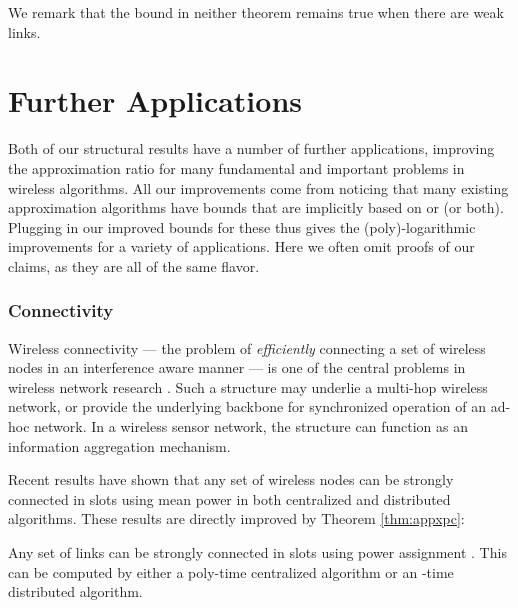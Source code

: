 \documentclass[11pt]{amsart}
\begin{document}
We remark that the bound in neither theorem remains true when there are weak links.


\iffalse
Effectiveness is closely related to \emph{inductive independence} in
weighted graphs \cite{DBLP:conf/spaa/HoeferKV11}, if we replace the mention of
``PC-feasibility'' in the definition to -feasibility.
The difference is that ``independence'' is defined with
respect to , while effectiveness compares the solution obtained
with power  with an optimum solution that uses arbitrary power
assignment.
\fi





\section{Further Applications}
\label{sec:fapplications}

Both of our structural
results have a number of further applications, improving the approximation ratio for many fundamental and important
problems in wireless algorithms. All our improvements come from noticing
that many existing approximation algorithms have bounds that are implicitly 
based on  or  (or both).
Plugging in our improved bounds for these thus gives the (poly)-logarithmic
improvements for a variety of applications. Here we often omit 
proofs of our claims, as they are all of the same flavor.

\subsubsection*{Connectivity}
Wireless connectivity --- the problem of \emph{efficiently} connecting a set of wireless nodes in an interference aware manner --- is one of the central problems in wireless network research \cite{HM12}. Such a structure may underlie a multi-hop wireless network, or
provide the underlying backbone for synchronized operation of an ad-hoc network. In a wireless sensor
network, the structure can function as an information aggregation mechanism.

Recent results have shown that any set of wireless nodes can be strongly connected
in  slots using mean power in both centralized \cite{HM12} and distributed \cite{PODC12} algorithms. These results are directly improved by Theorem \ref{thm:appxpc}:

\begin{theorem}
Any set of links can be strongly connected in  slots using power assignment . This can be computed
by either a poly-time centralized algorithm or an -time distributed algorithm.
\end{theorem}
\end{document}
